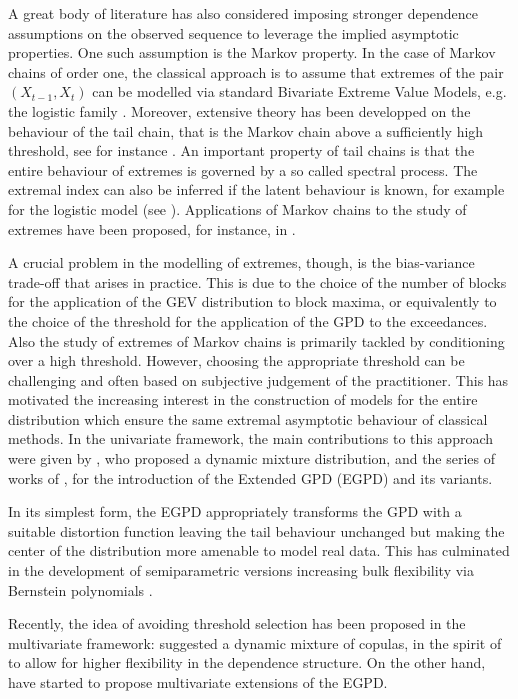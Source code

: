 \documentclass[11pt, a4paper]{article}
\begin{document}
A great body of literature has also considered imposing stronger dependence assumptions on the observed sequence to leverage the implied asymptotic properties. One such assumption is the Markov property. In the case of Markov chains of order one, the classical approach is to assume that extremes of the pair $(X_{t-1}, X_t)$ can be modelled via standard Bivariate Extreme Value Models, e.g. the logistic family \parencite[Chapter 8]{coles2001}. Moreover, extensive theory has been developped on the behaviour of the tail chain, that is the Markov chain above a sufficiently high threshold, see for instance \textcite{drees2015, papastathopoulos2017}. An important property of tail chains is that the entire behaviour of extremes is governed by a so called spectral process. The extremal index can also be inferred if the latent behaviour is known, for example for the logistic model (see \textcite[Section 10.4.2]{beirlant2005}). Applications of Markov chains to the study of extremes have been proposed, for instance, in \textcite{fawcett2006, winter2016, winter2017}.

A crucial problem in the modelling of extremes, though, is the bias-variance trade-off that arises in practice. This is due to the choice of the number of blocks for the application of the GEV distribution to block maxima, or equivalently to the choice of the threshold for the application of the GPD to the exceedances. Also the study of extremes of Markov chains is primarily tackled by conditioning over a high threshold. However, choosing the appropriate threshold can be challenging and often based on subjective judgement of the practitioner. This has motivated the increasing interest in the construction of models for the entire distribution which ensure the same extremal asymptotic behaviour of classical methods. In the univariate framework, the main contributions to this approach were given by \textcite{frigessi2002}, who proposed a dynamic mixture distribution, and the series of works of \textcite{papastathopoulos2013, naveau2016, stein2021, gamet2022}, for the introduction of the Extended GPD (EGPD) and its variants.

In its simplest form, the EGPD appropriately transforms the GPD with a suitable distortion function leaving the tail behaviour unchanged but making the center of the distribution more amenable to model real data. This has culminated in the development of semiparametric versions increasing bulk flexibility via Bernstein polynomials \parencite{tencaliec2020}.

Recently, the idea of avoiding threshold selection has been proposed in the multivariate framework: \textcite{andre2024} suggested a dynamic mixture of copulas, in the spirit of \textcite{frigessi2002} to allow for higher flexibility in the dependence structure. On the other hand, \textcite{gaetan2025, alotaibi2025} have started to propose multivariate extensions of the EGPD.
\end{document}
